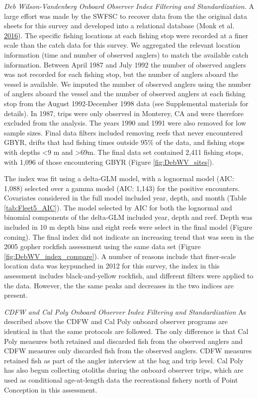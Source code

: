 \documentclass[12pt,]{article}
\begin{document}
\emph{Deb Wilson-Vandenberg Onboard Observer Index Filtering and
Standardization.} A large effort was made by the SWFSC to recover data
from the the original data sheets for this survey and developed into a
relational database (Monk et al.
\protect\hyperlink{ref-Monk2016}{2016}). The specific fishing locations
at each fishing stop were recorded at a finer scale than the catch data
for this survey. We aggregated the relevant location information (time
and number of observed anglers) to match the available catch
information. Between April 1987 and July 1992 the number of observed
anglers was not recorded for each fishing stop, but the number of
anglers aboard the vessel is available. We imputed the number of
observed anglers using the number of anglers aboard the vessel and the
number of observed anglers at each fishing stop from the August
1992-December 1998 data (see Supplemental materials for details). In
1987, trips were only observed in Monterey, CA and were therefore
excluded from the analysis. The years 1990 and 1991 were also removed
for low sample sizes. Final data filters included removing reefs that
never encountered GBYR, drifts that had fishing times outside 95\% of
the data, and fishing stops with depths \textless{}9 m and
\textgreater{}69m. The final data set contained 2,411 fishing stops,
with 1,096 of those encountering GBYR (Figure \ref{fig:DebWV_sites}).

The index was fit using a delta-GLM model, with a lognormal model (AIC:
1,088) selected over a gamma model (AIC: 1,143) for the positive
encounters. Covariates considered in the full model included year,
depth, and month (Table \ref{tab:Fleet5_AIC}). The model selected by AIC
for both the lognormal and binomial components of the delta-GLM included
year, depth and reef. Depth was included in 10 m depth bins and eight
reefs were select in the final model (Figure coming). The final index
did not indicate an increasing trend that was seen in the 2005 gopher
rockfish assessment using the same data set (Figure
\ref{fig:DebWV_index_compare}). A number of reasons include that
finer-scale location data was keypunched in 2012 for this survey, the
index in this assessment includes black-and-yellow rockfish, and
different filters were applied to the data. However, the the same peaks
and decreases in the two indices are present.

\emph{CDFW and Cal Poly Onboard Observer Index Filtering and
Standardization} As described above the CDFW and Cal Poly onboard
observer programs are identical in that the same protocols are followed.
The only difference is that Cal Poly measures both retained and
discarded fish from the observed anglers and CDFW measures only
discarded fish from the observed anglers. CDFW measures retained fish as
part of the angler interview at the bag and trip level. Cal Poly has
also begun collecting otoliths during the onboard observer trips, which
are used as conditional age-at-length data the recreational fishery
north of Point Conception in this assessment.
\end{document}

